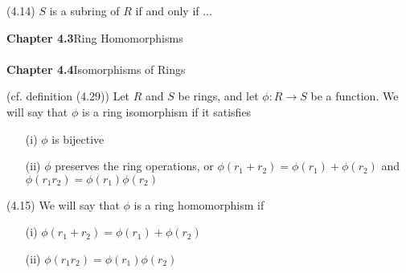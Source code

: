 \vspace{2ex}
\begin{prop}
 (4.14) $S$ is a subring of $R$ if and only if $\ldots $
\end{prop}
\vspace{2ex}
{\bf Chapter 4.3}\hspace{2ex}Ring Homomorphisms
\\\\
{\bf Chapter 4.4}\hspace{2ex}Isomorphisms of Rings
\\
\begin{defi}
 (cf. definition (4.29)) Let $R$ and $S$ be rings, and let $\phi :R\rightarrow S$ be a function. We will say that $\phi $ is a ring isomorphism if it satisfies
\begin{itemize}
	\item[(i)] $\phi$ is bijective 
	\item[(ii)] $\phi $ preserves the ring operations, or $\phi (r_1+r_2)=\phi (r_1)+\phi (r_2)$ and $\phi (r_1r_2)=\phi (r_1)\phi (r_2)$
\end{itemize}
\end{defi}
\vspace{2ex}
\begin{defi}
 (4.15) We will say that $\phi $ is a ring homomorphism if 
\begin{itemize}
	\item[(i)] $\phi (r_1+r_2)=\phi (r_1)+\phi (r_2)$ 
	\item[(ii)] $\phi (r_1r_2)=\phi(r_1)\phi(r_2)$
\end{itemize}
\end{defi}
\vspace{2ex}

